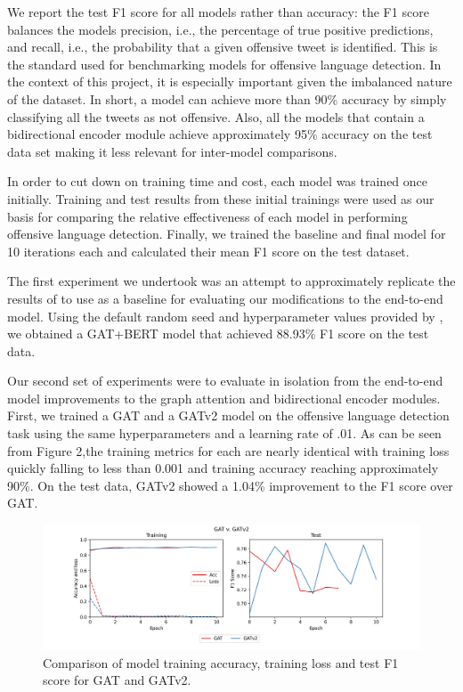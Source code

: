 \documentclass[letterpaper]{article} %
\begin{document}
We report the test F1 score for all models rather than accuracy: the F1 score balances the models precision, i.e., the percentage of true positive predictions, and recall, i.e., the probability that a given offensive tweet is identified. This is the standard used for benchmarking models for offensive language detection. In the context of this project, it is especially important given the imbalanced nature of the dataset. In short, a model can achieve more than 90\% accuracy by simply classifying all the tweets as not offensive. Also, all the models that contain a bidirectional encoder module achieve approximately 95\% accuracy on the test data set making it less relevant for inter-model comparisons. 

In order to cut down on training time and cost, each model was trained once initially. Training and test results from these initial trainings were used as our basis for comparing the relative effectiveness of each model in performing offensive language detection. Finally, we trained the baseline and final model for 10 iterations each and calculated their mean F1 score on the test dataset. 

The first experiment we undertook was an attempt to approximately replicate the results of \citet{Miao2022} to use as a baseline for evaluating our modifications to the end-to-end model. Using the default random seed and hyperparameter values provided by \citet{Miao2022}, we obtained a GAT+BERT model that achieved 88.93\% F1 score on the test data. 

Our second set of experiments were to evaluate in isolation from the end-to-end model improvements to the graph attention and bidirectional encoder modules. First, we trained a GAT and a GATv2 model on the offensive language detection task using the same hyperparameters and a learning rate of .01. As can be seen from Figure 2,the training metrics for each are nearly identical with training loss quickly falling to less than 0.001 and training accuracy reaching approximately 90\%. On the test data, GATv2 showed a 1.04\% improvement to the F1 score over GAT. 

\begin{figure}
    \includegraphics[width=\linewidth]{gat_v_gatv2.png}
    \caption{Comparison of model training accuracy, training loss and test F1 score for GAT and GATv2.}
\end{figure}
\end{document}
